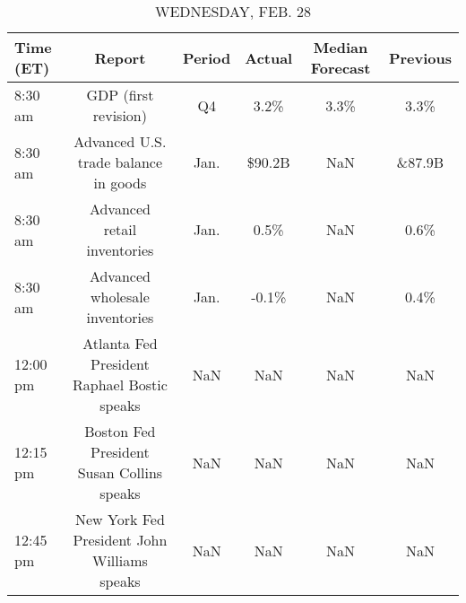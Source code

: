 \documentclass{article}%
\begin{document}
\begin{table}[htbp]%
\caption{WEDNESDAY, FEB. 28}%
\centering%
\begin{adjustbox}{width=1\textwidth}%
\begin{tabular}{lccccc}
\toprule
Time (ET) &                                      Report & Period & Actual & Median Forecast & Previous \\
\midrule
  8:30 am &                        GDP (first revision) &     Q4 &   3.2\% &            3.3\% &     3.3\% \\
  8:30 am &        Advanced U.S. trade balance in goods &   Jan. & \$90.2B &             NaN &   \&87.9B \\
  8:30 am &                 Advanced retail inventories &   Jan. &   0.5\% &             NaN &     0.6\% \\
  8:30 am &              Advanced wholesale inventories &   Jan. &  -0.1\% &             NaN &     0.4\% \\
 12:00 pm & Atlanta Fed President Raphael Bostic speaks &    NaN &    NaN &             NaN &      NaN \\
 12:15 pm &   Boston Fed President Susan Collins speaks &    NaN &    NaN &             NaN &      NaN \\
 12:45 pm & New York Fed President John Williams speaks &    NaN &    NaN &             NaN &      NaN \\
\bottomrule
\end{tabular}
%
\end{adjustbox}%
\end{table}

%
\end{document}
